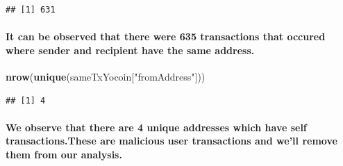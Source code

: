 \documentclass[]{article}
\newenvironment{Shaded}{\begin{snugshade}}{\end{snugshade}}
\newcommand{\KeywordTok}[1]{\textcolor[rgb]{0.13,0.29,0.53}{\textbf{#1}}}
\newcommand{\StringTok}[1]{\textcolor[rgb]{0.31,0.60,0.02}{#1}}
\newcommand{\OperatorTok}[1]{\textcolor[rgb]{0.81,0.36,0.00}{\textbf{#1}}}
\newcommand{\NormalTok}[1]{#1}
\let\oldparagraph\paragraph
\renewcommand{\paragraph}[1]{\oldparagraph{#1}\mbox{}}
\begin{document}
\begin{Shaded}
\end{Shaded}

\begin{verbatim}
## [1] 631
\end{verbatim}

\paragraph{It can be observed that there were 635 transactions that
occured where sender and recipient have the same
address.}\label{it-can-be-observed-that-there-were-635-transactions-that-occured-where-sender-and-recipient-have-the-same-address.-1}

\begin{Shaded}
\begin{Highlighting}[]
\KeywordTok{nrow}\NormalTok{(}\KeywordTok{unique}\NormalTok{(sameTxYocoin[}\StringTok{"fromAddress"}\NormalTok{]))}
\end{Highlighting}
\end{Shaded}

\begin{verbatim}
## [1] 4
\end{verbatim}

\paragraph{We observe that there are 4 unique addresses which have self
transactions.These are malicious user transactions and we'll remove them
from our
analysis.}\label{we-observe-that-there-are-4-unique-addresses-which-have-self-transactions.these-are-malicious-user-transactions-and-well-remove-them-from-our-analysis.}

\begin{Shaded}
\end{Shaded}
\end{document}
